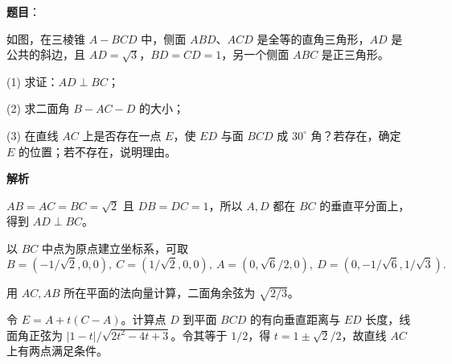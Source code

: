 \begin{answer}

\textbf{题目}：

如图，在三棱锥 $A-BCD$ 中，侧面 $ABD\text{、}ACD$ 是全等的直角三角形，$AD$ 是公共的斜边，且 $AD=\sqrt3\text{，}BD=CD=1$，另一个侧面 $ABC$ 是正三角形。

(1) 求证：$AD\perp BC$；

(2) 求二面角 $B-AC-D$ 的大小；

(3) 在直线 $AC$ 上是否存在一点 $E$，使 $ED$ 与面 $BCD$ 成 $30^\circ$ 角？若存在，确定 $E$ 的位置；若不存在，说明理由。
\nopagebreak[4]
\begin{center}\end{center}
\nopagebreak[4]
\textbf{解析}


$AB=AC=BC=\sqrt2$ 且 $DB=DC=1$，所以 $A,D$ 都在 $BC$ 的垂直平分面上，得到 $AD\perp BC$。


以 $BC$ 中点为原点建立坐标系，可取
\nopagebreak[4]
\[
B=(-1/\sqrt2,0,0),\ C=(1/\sqrt2,0,0),\ A=(0,\sqrt6/2,0),\ D=(0,-1/\sqrt6,1/\sqrt3).
\]

用 $AC,AB$ 所在平面的法向量计算，二面角余弦为 $\sqrt{2/3}$。


令 $E=A+t(C-A)$。计算点 $D$ 到平面 $BCD$ 的有向垂直距离与 $ED$ 长度，线面角正弦为 $|1-t|/\sqrt{2t^2-4t+3}$。令其等于 $1/2$，得 $t=1\pm\sqrt2/2$，故直线 $AC$ 上有两点满足条件。




\end{answer}
